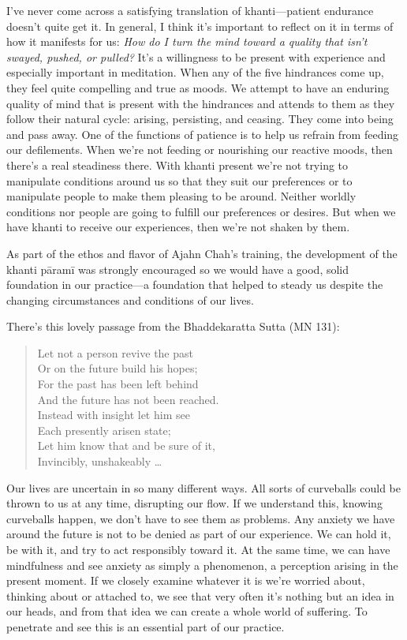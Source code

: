 I've never come across a satisfying translation of khanti---patient 
endurance doesn't quite get it. In general, I think it's important to 
reflect on it in terms of how it manifests for us: \emph{How do I turn 
the mind toward a quality that isn't swayed, pushed, or pulled?} It's a 
willingness to be present with experience and especially important in 
meditation. When any of the five hindrances come up, they feel quite 
compelling and true as moods. We attempt to have an enduring quality of 
mind that is present with the hindrances and attends to them as they 
follow their natural cycle: arising, persisting, and ceasing. They come 
into being and pass away. One of the functions of patience is to help 
us refrain from feeding our defilements. When we're not feeding or 
nourishing our reactive moods, then there's a real steadiness there. 
With khanti present we're not trying to manipulate conditions around us 
so that they suit our preferences or to manipulate people to make them 
pleasing to be around. Neither worldly conditions nor people are going 
to fulfill our preferences or desires. But when we have khanti to 
receive our experiences, then we're not shaken by them.

As part of the ethos and flavor of Ajahn Chah's training, the 
development of the khanti pāramī was strongly encouraged so we would 
have a good, solid foundation in our practice---a foundation that 
helped to steady us despite the changing circumstances and conditions 
of our lives.


There's this lovely passage from the Bhaddekaratta Sutta (MN 131):

\begin{quote}
Let not a person revive the past\\
Or on the future build his hopes;\\
For the past has been left behind\\
And the future has not been reached.\\
Instead with insight let him see\\
Each presently arisen state;\\
Let him know that and be sure of it,\\
Invincibly, unshakeably \ldots{}

\end{quote}

Our lives are uncertain in so many different ways. All sorts of 
curveballs could be thrown to us at any time, disrupting our flow. If 
we understand this, knowing curveballs happen, we don't have to see 
them as problems. Any anxiety we have around the future is not to be 
denied as part of our experience. We can hold it, be with it, and try 
to act responsibly toward it. At the same time, we can have mindfulness 
and see anxiety as simply a phenomenon, a perception arising in the 
present moment. If we closely examine whatever it is we're worried 
about, thinking about or attached to, we see that very often it's 
nothing but an idea in our heads, and from that idea we can create a 
whole world of suffering. To penetrate and see this is an essential 
part of our practice.

